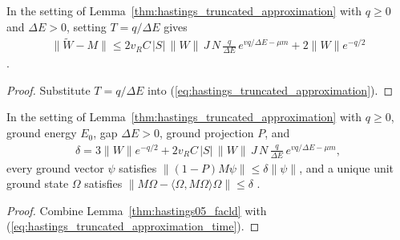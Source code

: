\begin{lemma}[The truncated approximation at the time window $T=q/\Delta E$]
    \label{thm:hastings_truncated_approximation_time}
    \leanok
    In the setting of Lemma~\ref{thm:hastings_truncated_approximation} with
    $q\ge0$ and $\Delta E>0$, setting $T=q/\Delta E$ gives
    \begin{align}
        \|\widetilde W-M\|\le2v_RC\,|S|\,\|W\|\,J\,N\,\frac{q}{\Delta E}\,
        e^{vq/\Delta E-\mu m}+2\|W\|e^{-q/2}
        \label{eq:hastings_truncated_approximation_time}
    \end{align}
    \cite[lines 337--349]{Hastings2006Solving}.
\end{lemma}
\begin{proof}
    \leanok
    Substitute $T=q/\Delta E$ into (\ref{eq:hastings_truncated_approximation}).
\end{proof}

\begin{lemma}
    \label{thm:hastings_truncated_facld}
    \leanok
    In the setting of Lemma~\ref{thm:hastings_truncated_approximation} with
    $q\ge0$, ground energy $E_0$, gap $\Delta E>0$, ground projection $P$, and
    \begin{align}
        \delta=3\|W\|e^{-q/2}+2v_RC\,|S|\,\|W\|\,J\,N\,\frac{q}{\Delta E}\,
        e^{vq/\Delta E-\mu m},
        \label{eq:hastings_truncated_facld_delta}
    \end{align}
    every ground vector $\psi$ satisfies $\|(1-P)M\psi\|\le\delta\|\psi\|$, and
    a unique unit ground state $\Omega$ satisfies
    $\|M\Omega-\langle\Omega,M\Omega\rangle\Omega\|\le\delta$
    \cite[eq.~(facld), lines 322--348 and 375--387]{Hastings2006Solving}.
\end{lemma}
\begin{proof}
    \leanok
    Combine Lemma~\ref{thm:hastings05_facld} with
    (\ref{eq:hastings_truncated_approximation_time}).
\end{proof}

